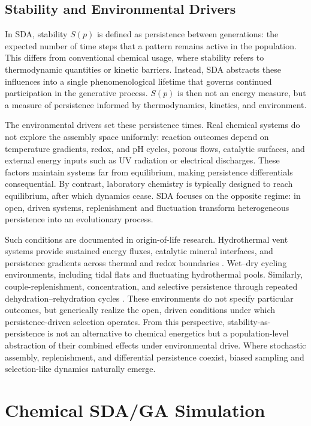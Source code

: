 \documentclass{artificial-life}
\begin{document}
\subsection{Stability and Environmental Drivers}\label{environ}

In SDA, stability $S(p)$ is defined as persistence between generations: the expected number of time steps that a pattern remains active in the population. This differs from conventional chemical usage, where stability refers to thermodynamic quantities or kinetic barriers. Instead, SDA abstracts these influences into a single phenomenological lifetime that governs continued participation in the generative process. $S(p)$ is then not an energy measure, but a measure of persistence informed by thermodynamics, kinetics, and environment.

The environmental drivers set these persistence times. Real chemical systems do not explore the assembly space uniformly: reaction outcomes depend on temperature gradients, redox, and pH cycles, porous flows, catalytic surfaces, and external energy inputs such as UV radiation or electrical discharges. These factors maintain systems far from equilibrium, making persistence differentials consequential. By contrast, laboratory chemistry is typically designed to reach equilibrium, after which dynamics cease. SDA focuses on the opposite regime: in open, driven systems, replenishment and fluctuation transform heterogeneous persistence into an evolutionary process.

Such conditions are documented in origin-of-life research. Hydrothermal vent systems provide sustained energy fluxes, catalytic mineral interfaces, and persistence gradients across thermal and redox boundaries \citep{martin2008energy}. Wet–dry cycling environments, including tidal flats and fluctuating hydrothermal pools. Similarly, couple-replenishment, concentration, and selective persistence through repeated dehydration–rehydration cycles \citep{damer2015coupled, rajamani2008lipid}. These environments do not specify particular outcomes, but generically realize the open, driven conditions under which persistence-driven selection operates. From this perspective, stability-as-persistence is not an alternative to chemical energetics but a population-level abstraction of their combined effects under environmental drive. Where stochastic assembly, replenishment, and differential persistence coexist, biased sampling and selection-like dynamics naturally emerge.


\section{Chemical SDA/GA Simulation}
\end{document}
